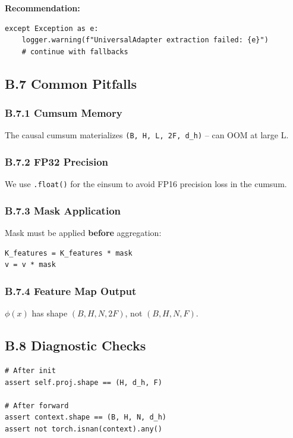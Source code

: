 \textbf{Recommendation:}
\begin{lstlisting}
except Exception as e:
    logger.warning(f"UniversalAdapter extraction failed: {e}")
    # continue with fallbacks
\end{lstlisting}

\subsection{B.7 Common Pitfalls}

\subsubsection{B.7.1 Cumsum Memory}

The causal cumsum materializes \texttt{(B, H, L, 2F, d\_h)} -- can OOM at 
large L.

\subsubsection{B.7.2 FP32 Precision}

We use \texttt{.float()} for the einsum to avoid FP16 precision loss in the 
cumsum.

\subsubsection{B.7.3 Mask Application}

Mask must be applied \textbf{before} aggregation:

\begin{lstlisting}
K_features = K_features * mask
v = v * mask
\end{lstlisting}

\subsubsection{B.7.4 Feature Map Output}

$\phi(x)$ has shape $(B, H, N, 2F)$, not $(B, H, N, F)$.

\subsection{B.8 Diagnostic Checks}

\begin{lstlisting}
# After init
assert self.proj.shape == (H, d_h, F)

# After forward
assert context.shape == (B, H, N, d_h)
assert not torch.isnan(context).any()
\end{lstlisting}



